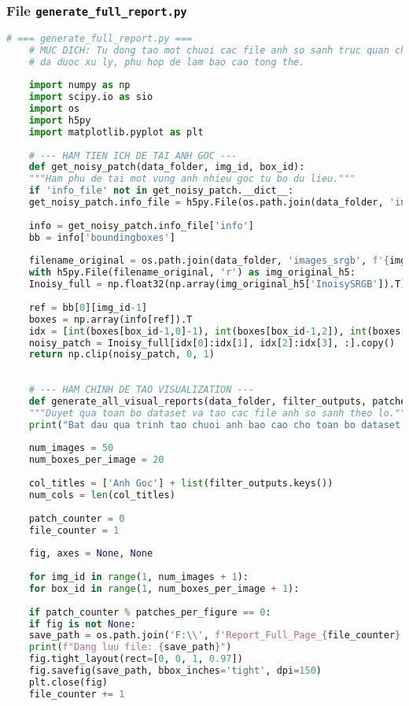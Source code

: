 \documentclass[12pt, a4paper]{article}
\begin{document}
\subsubsection{File \texttt{generate\_full\_report.py}}
\begin{lstlisting}[language=Python, caption={Mã nguồn tạo chuỗi ảnh báo cáo tổng hợp.}, label={lst:generate_full_report}]
	# === generate_full_report.py ===
	# MUC DICH: Tu dong tao mot chuoi cac file anh so sanh truc quan cho TAT CA cac ket qua
	# da duoc xu ly, phu hop de lam bao cao tong the.
	
	import numpy as np
	import scipy.io as sio
	import os
	import h5py
	import matplotlib.pyplot as plt
	
	# --- HAM TIEN ICH DE TAI ANH GOC ---
	def get_noisy_patch(data_folder, img_id, box_id):
	"""Ham phu de tai mot vung anh nhieu goc tu bo du lieu."""
	if 'info_file' not in get_noisy_patch.__dict__:
	get_noisy_patch.info_file = h5py.File(os.path.join(data_folder, 'info.mat'), 'r')
	
	info = get_noisy_patch.info_file['info']
	bb = info['boundingboxes']
	
	filename_original = os.path.join(data_folder, 'images_srgb', f'{img_id:04d}.mat')
	with h5py.File(filename_original, 'r') as img_original_h5:
	Inoisy_full = np.float32(np.array(img_original_h5['InoisySRGB']).T)
	
	ref = bb[0][img_id-1]
	boxes = np.array(info[ref]).T
	idx = [int(boxes[box_id-1,0]-1), int(boxes[box_id-1,2]), int(boxes[box_id-1,1]-1), int(boxes[box_id-1,3])]
	noisy_patch = Inoisy_full[idx[0]:idx[1], idx[2]:idx[3], :].copy()
	return np.clip(noisy_patch, 0, 1)
	
	
	# --- HAM CHINH DE TAO VISUALIZATION ---
	def generate_all_visual_reports(data_folder, filter_outputs, patches_per_figure=5):
	"""Duyet qua toan bo dataset va tao cac file anh so sanh theo lo."""
	print("Bat dau qua trinh tao chuoi anh bao cao cho toan bo dataset...")
	
	num_images = 50
	num_boxes_per_image = 20
	
	col_titles = ['Anh Goc'] + list(filter_outputs.keys())
	num_cols = len(col_titles)
	
	patch_counter = 0
	file_counter = 1
	
	fig, axes = None, None
	
	for img_id in range(1, num_images + 1):
	for box_id in range(1, num_boxes_per_image + 1):
	
	if patch_counter % patches_per_figure == 0:
	if fig is not None:
	save_path = os.path.join('F:\\', f'Report_Full_Page_{file_counter}.png')
	print(f"Dang luu file: {save_path}")
	fig.tight_layout(rect=[0, 0, 1, 0.97])
	fig.savefig(save_path, bbox_inches='tight', dpi=150)
	plt.close(fig)
	file_counter += 1
	

\end{lstlisting}
\end{document}
